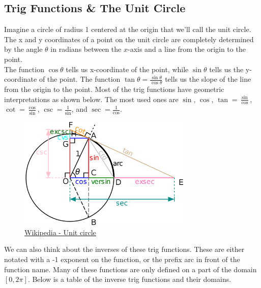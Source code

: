 \subsection{Trig Functions \& The Unit Circle}
\noindent
Imagine a circle of radius 1 centered at the origin that we'll call the unit circle. The x and y coordinates of a point on the unit circle are completely determined by the angle $\theta$ in radians between the $x$-axis and a line from the origin to the point.\\

\noindent
The function $\cos{\theta}$ tells us x-coordinate of the point, while $\sin{\theta}$ tells us the y-coordinate of the point. The function $\tan{\theta} = \frac{\sin{\theta}}{\cos{\theta}}$ tells us the slope of the line from the origin to the point. Most of the trig functions have geometric interpretations as shown below. The most used ones are $\sin$, $\cos$, $\tan=\frac{\sin}{\cos}$, $\cot = \frac{\cos}{\sin}$, $\csc=\frac{1}{\sin}$, and $\sec=\frac{1}{\cos}$.

\begin{figure}[H]
	\label{unitCircle}
	\centering
	\includegraphics[width = 0.75\textwidth]{../common/algebraPreCalc/unitCircle2.png}
	\caption{\hyperref{https://en.wikipedia.org/wiki/Unit_circle}{}{}{Wikipedia - Unit circle}}
\end{figure}

\noindent
We can also think about the inverses of these trig functions. These are either notated with a -1 exponent on the function, or the prefix arc in front of the function name. Many of these functions are only defined on a part of the domain $\left[0, 2\pi\right]$. Below is a table of the inverse trig functions and their domains.

